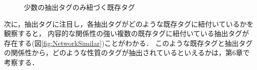 \begin{figure}[htb]
\begin{center}
\hspace*{-20pt}
\end{center}
\caption{少数の抽出タグのみ紐づく既存タグ}
\label{fig:NetworkLittle}
\end{figure}

次に，抽出タグに注目し，各抽出タグがどのような既存タグに紐付いているかを観察すると，
内容的な関係性の強い複数の既存タグに紐付いている抽出タグが存在する(図\ref{fig:NetworkSimilar})ことがわかる．	
このような既存タグと抽出タグの関係性から，どのような性質のタグが抽出されているといえるかは，第6章で考察する．

